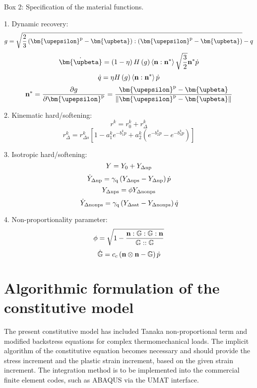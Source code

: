\begin{framed}
\label{Box:1}
Box 2: Specification of the material functions.

1. Dynamic recovery:
\[g = \sqrt {\frac{2}{3}\left( {{{\bm{\upepsilon }}^{\rm{p}}} - {\bm{\upbeta}}} \right):\left( {{{\bm{\upepsilon }}^{\rm{p}}} - {\bm{\upbeta}}} \right)}  - q\]
\[{\dot{\bm{\upbeta}}}  = \left( {1 - \eta } \right)H\left( g \right)\left\langle {{\bf{n}}:{{\bf{n}}^*}} \right\rangle \sqrt {\frac{3}{2}} {{\bf{n}}^*}\dot p\]
\[\dot q = \eta H\left( g \right)\left\langle {{\bf{n}}:{{\bf{n}}^*}} \right\rangle \dot p\]
\[{{\bf{n}}^*} = \frac{{\partial g}}{{\partial {{\bm{\upepsilon }}^{\rm{p}}}}} = \frac{{{{\bm{\upepsilon }}^{\rm{p}}} - {\bm{\upbeta}}}}{{\left\| {{{\bm{\upepsilon }}^{\rm{p}}} - {\bm{\upbeta}}} \right\|}}\]

2. Kinematic hard/softening:
\[{r^k} = r_0^k + r_\Delta ^k\]
\[r_\Delta ^k = r_{\Delta s}^k\left[ {1 - a_1^k{e^{ - b_1^kp}} + a_2^k({e^{ - b_2^kp}} - {e^{ - b_3^kp}})} \right]\]

3. Isotropic hard/softening:
\[Y = {Y_0} + {Y_{\Delta \rm np}}\]
\[{\dot Y_{\Delta \rm np}} = {\gamma _{\rm q}}\left( {{Y_{\Delta \rm nps}} - {Y_{\Delta \rm np}}} \right)\dot p\]
\[{Y_{\Delta \rm nps}} = \phi {Y_{\Delta \rm nonps}}\]
\[{\dot Y_{\Delta \rm nonps}} = {\gamma _{\rm q}}\left( {{Y_{\Delta \rm sat}} - {Y_{\Delta \rm nonps}}} \right)\dot q\]


4. Non-proportionality parameter:
\[\phi  = \sqrt {1 - \frac{{{\bf{n}}:\mathbb{G}:\mathbb{G}:{\bf{n}}}}{{\mathbb{G}::\mathbb{G}}}} \]
\[\dot {\mathbb{G}} = {c_c}\left( {{\bf{n}} \otimes {\bf{n}} - \mathbb{G}} \right)\dot p\]

\end{framed}

\section{Algorithmic formulation of the constitutive model}
\noindent
The present constitutive model has included Tanaka non-proportional term and modified backstress equations for complex thermomechanical loads. The implicit algorithm of the constitutive equation becomes necessary and should provide the stress increment and the plastic strain increment, based on the given strain increment. The integration method is to be implemented into the commercial finite element codes, such as ABAQUS via the UMAT interface.

